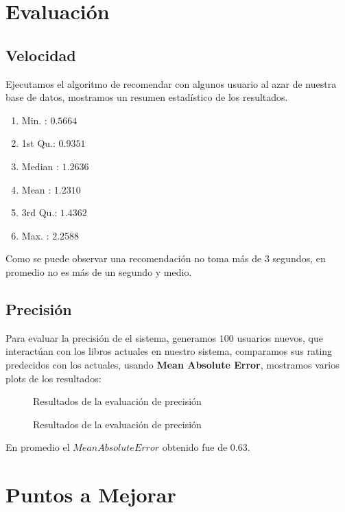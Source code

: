 \documentclass[14pt]{extarticle}
\begin{document}
\section{Evaluación}
\subsection{Velocidad}

Ejecutamos el algoritmo de recomendar con algunos usuario al azar de nuestra base de datos, mostramos un resumen estadístico de los resultados. 
\begin{enumerate}
    \item Min.   : $0.5664$
    \item 1st Qu.: $0.9351$
    \item  Median : $1.2636  $
    \item Mean   : $1.2310  $
    \item 3rd Qu.: $1.4362 $
    \item Max.   : $2.2588$ 
\end{enumerate}

Como se puede observar una recomendación no toma más de $3$ segundos, en promedio no es más de un segundo y medio.

\subsection{Precisión}

Para evaluar la precisión de el sistema, generamos $100$ usuarios nuevos, que interactúan con los libros actuales en nuestro sistema, comparamos sus rating predecidos con los actuales, usando \textbf{Mean Absolute Error}, mostramos varios plots de los resultados:

\begin{figure}[H]
    \centering
    
    \caption{Resultados de la evaluación de precisión}
    \label{fig:precision-plot}
\end{figure}

\begin{figure}[H]
    \centering
    
    \caption{Resultados de la evaluación de precisión}
    \label{fig:precision-plot}
\end{figure}

En promedio el $Mean Absolute Error$ obtenido fue de $0.63$. 

\section{Puntos a Mejorar}
\end{document}
